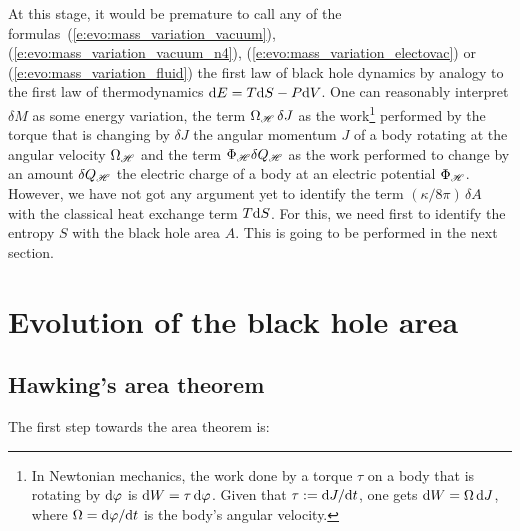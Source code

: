 At this stage, it would be premature to call any of the formulas~(\ref{e:evo:mass_variation_vacuum}),
(\ref{e:evo:mass_variation_vacuum_n4}), (\ref{e:evo:mass_variation_electovac})
or (\ref{e:evo:mass_variation_fluid})
the first law of black hole dynamics by analogy to the first law of thermodynamics
$\mathrm{d} E = T \mathrm{d} S - P \mathrm{d} V$. One can reasonably interpret $\delta M$
as some energy variation, the term
$\Omega_{\mathscr{H}} \, \delta J$ as the work\footnote{In Newtonian mechanics, the
work done by a torque $\tau$ on a body that is rotating by $\mathrm{d}\varphi$
is $\mathrm{d} W = \tau \, \mathrm{d}\varphi$. Given that $\tau := \mathrm{d} J/\mathrm{d} t$, one gets $\mathrm{d} W = \Omega \, \mathrm{d} J$, where
$\Omega = \mathrm{d}\varphi/\mathrm{d} t$ is the body's angular velocity.} performed by the torque
that is changing by $\delta J$ the angular momentum $J$ of a body rotating
at the angular velocity $\Omega_{\mathscr{H}}$ and the term $\Phi_{\mathscr{H}} \delta Q_{\mathscr{H}}$
as the work performed to change by an amount $\delta Q_{\mathscr{H}}$ the electric charge
of a body at an electric potential $\Phi_{\mathscr{H}}$.
However, we have not got any argument yet
to identify the term $(\kappa/8\pi) \, \delta A$ with the classical heat exchange term $T\mathrm{d} S$.
For this, we need first to identify the entropy $S$ with the black hole area $A$.
This is going to be performed in the next section.



\section{Evolution of the black hole area}

\subsection{Hawking's area theorem}

The first step towards the area theorem is:

